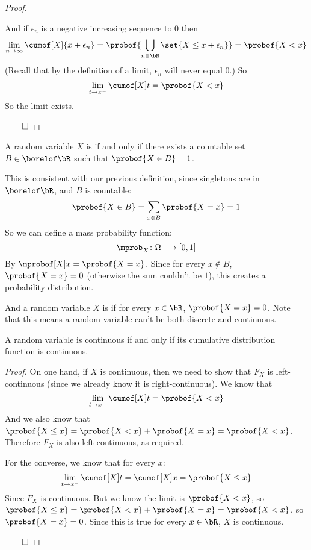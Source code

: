 \begin{proof}
\begin{msecenumerate}[0pt]
			And if $\epsilon_n$ is a negative increasing sequence to $0$ then
			\[ \lim_{n\to\infty}\cumof[X]{x+\epsilon_n} = \probof{\bigcup_{n\in\bN}\set{X\leq x+\epsilon_n}} = \probof{X<x} \]
			(Recall that by the definition of a limit, $\epsilon_n$ will never equal $0$.)
			So
			\[ \lim_{t\to x^-}\cumof[X]t = \probof{X<x} \]
			So the limit exists.
	\end{msecenumerate}

	\hfill$\qed$

\end{proof}

\newpage
\begin{defn*}

	A random variable $X$ is  if and only if there exists a countable set $B\in\borelof\bR$ such that $\probof{X\in B}=1$.

	\begin{note}

		This is consistent with our previous definition, since singletons are in $\borelof\bR$, and $B$ is countable:
		\[ \probof{X\in B} = \sum_{x\in B}\probof{X=x} = 1 \]
		So we can define a mass probability function:
		\[ \mprob_X\colon\Omega\longrightarrow[0,1] \]
		By $\mprobof[X]x = \probof{X=x}$.
		Since for every $x\notin B$, $\probof{X=x}=0$ (otherwise the sum couldn't be $1$), this creates a probability distribution.

	\end{note}

	And a random variable $X$ is  if for every $x\in\bR$, $\probof{X=x}=0$.
	Note that this means a random variable can't be both discrete and continuous.

\end{defn*}

\begin{prop*}

	A random variable is continuous if and only if its cumulative distribution function is continuous.

\end{prop*}

\begin{proof}

	On one hand, if $X$ is continuous, then we need to show that $F_X$ is left-continuous (since we already know it is right-continuous).
	We know that
	\[ \lim_{t\to x^-}\cumof[X]t = \probof{X<x} \]
	And we also know that $\probof{X\leq x} = \probof{X<x} + \probof{X=x} = \probof{X<x}$.
	Therefore $F_X$ is also left continuous, as required.

	For the converse, we know that for every $x$:
	\[ \lim_{t\to x^-}\cumof[X]t = \cumof[X]x = \probof{X\leq x} \]
	Since $F_X$ is continuous.
	But we know the limit is $\probof{X<x}$, so $\probof{X\leq x}=\probof{X<x}+\probof{X=x}=\probof{X<x}$, so $\probof{X=x}=0$.
	Since this is true for every $x\in\bR$, $X$ is continuous.

	\hfill$\qed$

\end{proof}

